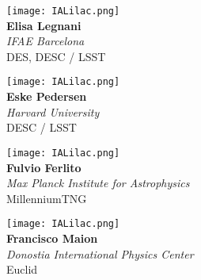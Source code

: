 \documentclass[10pt,letterpaper]{article}
\begin{document}
\newpage
\begin{multicols}{2}

    \begin{minipage}[t][2in][c]{.45\textwidth}
    \centering
    \texttt{[image: IALilac.png]}\\
    \Huge \textbf{Elisa Legnani}\\
    \vspace{0.3cm}
    \Large \textit{IFAE Barcelona} \\
    \vspace{0.5cm}
    \small DES, DESC / LSST
    \end{minipage}
    \vspace{.5cm}
    
    \begin{minipage}[t][2in][c]{.45\textwidth}
    \centering
    \texttt{[image: IALilac.png]}\\
    \Huge \textbf{Eske Pedersen}\\
    \vspace{0.3cm}
    \Large \textit{Harvard University} \\
    \vspace{0.5cm}
    \small DESC / LSST
    \end{minipage}
    \vspace{.5cm}
    
    \begin{minipage}[t][2in][c]{.45\textwidth}
    \centering
    \texttt{[image: IALilac.png]}\\
    \Huge \textbf{Fulvio Ferlito}\\
    \vspace{0.3cm}
    \Large \textit{Max Planck Institute for Astrophysics} \\
    \vspace{0.5cm}
    \small MillenniumTNG
    \end{minipage}
    \vspace{.5cm}
    
    \begin{minipage}[t][2in][c]{.45\textwidth}
    \centering
    \texttt{[image: IALilac.png]}\\
    \Huge \textbf{Francisco Maion}\\
    \vspace{0.3cm}
    \Large \textit{Donostia International Physics Center} \\
    \vspace{0.5cm}
    \small Euclid
    \end{minipage}
    \vspace{.5cm}
    

\end{multicols}
\end{document}
